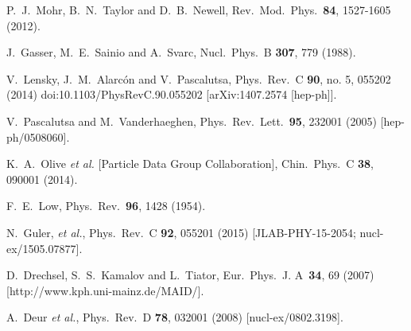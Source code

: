 \documentclass[twocolumn,prc,showpacs,nofootinbib,preprintnumbers,amsmath,amssymb,superscriptaddress]{revtex4-1}
\begin{document}
\begin{thebibliography}{99}
   
P.~J.~Mohr, B.~N.~Taylor and D.~B.~Newell,
Rev.\ Mod.\ Phys.\ {\bf 84}, 1527-1605 (2012).
   
J.~Gasser, M.~E.~Sainio and A.~Svarc,
Nucl.\ Phys.\ B {\bf 307}, 779 (1988).

  V.~Lensky, J.~M.~Alarc\'on and V.~Pascalutsa,
  Phys.\ Rev.\ C {\bf 90}, no. 5, 055202 (2014)
  doi:10.1103/PhysRevC.90.055202
  [arXiv:1407.2574 [hep-ph]].
  
  V.~Pascalutsa and M.~Vanderhaeghen,
  Phys.\ Rev.\ Lett.\  {\bf 95}, 232001 (2005)
  [hep-ph/0508060].

  K.~A.~Olive {\it et al.}  [Particle Data Group Collaboration],
  Chin.\ Phys.\ C {\bf 38}, 090001 (2014).

  F.~E.~Low,
  Phys.\ Rev.\  {\bf 96}, 1428 (1954).

N.~Guler, {\it et al.}, 
Phys.\ Rev.\ C {\bf 92}, 055201 (2015) [JLAB-PHY-15-2054; nucl-ex/1505.07877].


D.~Drechsel, S.~S.~Kamalov and L.~Tiator, Eur.\ Phys.\ J. A\ {\bf 34}, 69 (2007) 
[http://www.kph.uni-mainz.de/MAID/].

  A.~Deur {\it et al.},
  Phys.\ Rev.\ D {\bf 78}, 032001 (2008)
  [nucl-ex/0802.3198].


\end{thebibliography}
\end{document}
